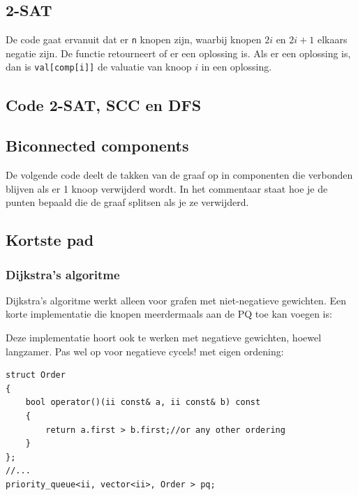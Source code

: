 \documentclass[10pt,a4paper,titlepage]{article}
\begin{document}

\subsection{2-SAT}

De code gaat ervanuit dat er \lstinline{n} knopen zijn, waarbij knopen $2i$ en $2i+1$ elkaars negatie zijn. De functie retourneert of er een oplossing is. Als er een oplossing is, dan is \lstinline{val[comp[i]]} de valuatie van knoop $i$ in een oplossing.

\subsection{Code 2-SAT, SCC en DFS}







\subsection{Biconnected components}

De volgende code deelt de takken van de graaf op in componenten die verbonden blijven als er 1 knoop verwijderd wordt. In het commentaar staat hoe je de punten bepaald die de graaf splitsen als je ze verwijderd.



\subsection{Kortste pad}

\subsubsection{Dijkstra's algoritme}

Dijkstra's algoritme werkt alleen voor grafen met niet-negatieve gewichten.
%
Een korte implementatie die knopen meerdermaals aan de PQ toe kan voegen is:

Deze implementatie hoort ook te werken met negatieve gewichten, hoewel langzamer. Pas wel op voor negatieve cycels!
met eigen ordening:
\begin{lstlisting}
struct Order
{
    bool operator()(ii const& a, ii const& b) const
    {
        return a.first > b.first;//or any other ordering
    }
};
//...
priority_queue<ii, vector<ii>, Order > pq;
\end{lstlisting}
\end{document}
